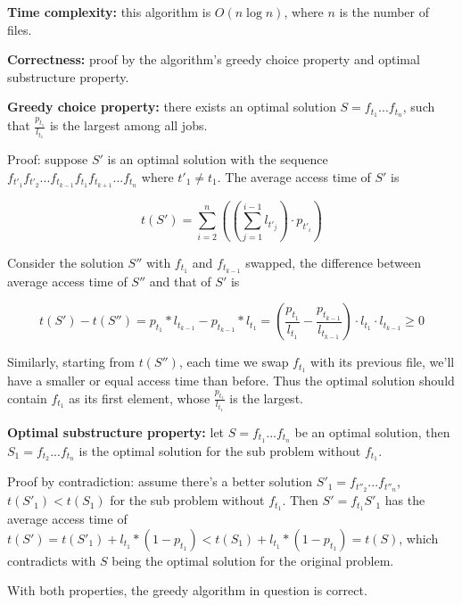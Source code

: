 \documentclass{article}
\begin{document}
\begin{description}
\begin{algorithm}[h]
\begin{algorithmic}[1]
    \end{algorithmic}
  \end{algorithm}

  \textbf{Time complexity:} this algorithm is $O(n \log n)$, where $n$ is the number of files.

  \textbf{Correctness:} proof by the algorithm's greedy choice property and optimal substructure property.

  \textbf{Greedy choice property:} there exists an optimal solution $S=f_{t_1}...f_{t_n}$, such that $\frac{p_{t_1}}{l_{t_1}}$ is the largest among all jobs.

  Proof: suppose $S'$ is an optimal solution with the sequence $f_{t'_1}f_{t'_2}...f_{t_{k-1}}f_{t_1}f_{t_{k+1}}...f_{t_n}$ where $t'_1 \neq t_1$. The average access time of $S'$ is 

  $$t(S') = \sum_{i=2}^{n}{((\sum_{j=1}^{i-1}{l_{t'_j}}) \cdot p_{t'_i})}$$

  Consider the solution $S''$ with $f_{t_1}$ and $f_{t_{k-1}}$ swapped, the difference between average access time of $S''$ and that of $S'$ is

  $$t(S') - t(S'') = p_{t_{1}} * l_{t_{k-1}} - p_{t_{k-1}} * l_{t_1} = (\frac{p_{t_1}}{l_{t_1}} - \frac{p_{t_{k-1}}}{l_{t_{k-1}}}) \cdot l_{t_1} \cdot l_{t_{k-1}} \geq 0$$

  Similarly, starting from $t(S'')$, each time we swap $f_{t_1}$ with its previous file, we'll have a smaller or equal access time than before. Thus the optimal solution should contain $f_{t_1}$ as its first element, whose $\frac{p_{t_1}}{l_{t_1}}$ is the largest.

  \textbf{Optimal substructure property:} let $S=f_{t_1}...f_{t_n}$ be an optimal solution, then $S_1=f_{t_2}...f_{t_n}$ is the optimal solution for the sub problem without $f_{t_1}$.

  Proof by contradiction: assume there's a better solution $S'_1=f_{t''_2}...f_{t''_n}$, $t(S'_1)<t(S_1)$ for the sub problem without $f_{t_1}$. Then $S'=f_{t_1}S'_1$ has the average access time of $t(S')=t(S'_1) + l_{t_1} * (1-p_{t_1}) < t(S_1) + l_{t_1} * (1-p_{t_1}) = t(S)$, which contradicts with $S$ being the optimal solution for the original problem.

  With both properties, the greedy algorithm in question is correct.


\end{description}
\end{document}
